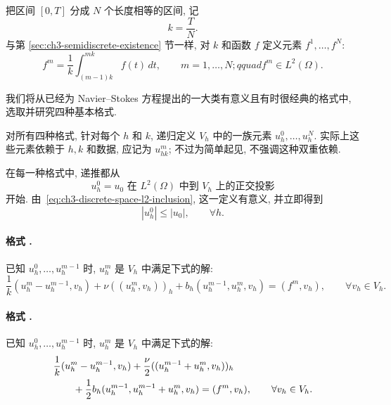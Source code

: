 把区间 $[0,T]$ 分成 $N$ 个长度相等的区间, 记
\begin{equation}
k=\frac TN.
\label{eq:ch3-discrete-time-step}
\end{equation}
与第 \ref{sec:ch3-semidiscrete-existence} 节一样, 对 $k$ 和函数 $f$ 定义元素 $f^1,\ldots,f^N$:
\begin{equation}
f^m=\frac1k\int_{(m-1)k}^{mk}f(t)\,dt,
\qquad m=1,\ldots,N;qquad f^m\in L^2(\Omega).
\label{eq:ch3-discrete-force-average}
\end{equation}

我们将从已经为 Navier--Stokes 方程提出的一大类有意义且有时很经典的格式中, 选取并研究四种基本格式.

对所有四种格式, 针对每个 $h$ 和 $k$, 递归定义 $V_h$ 中的一族元素 $u_h^0,\ldots,u_h^N$. 实际上这些元素依赖于 $h,k$ 和数据, 应记为 $u_{hk}^m$; 不过为简单起见, 不强调这种双重依赖.

在每一种格式中, 递推都从
\begin{equation}
u_h^0=\text{$u_0$ 在 $L^2(\Omega)$ 中到 $V_h$ 上的正交投影}
\label{eq:ch3-discrete-initial-projection}
\end{equation}
开始. 由 \,\eqref{eq:ch3-discrete-space-l2-inclusion}, 这一定义有意义, 并立即得到
\begin{equation}
|u_h^0|\leq|u_0|,
\qquad\forall h.
\label{eq:ch3-discrete-initial-projection-bound}
\end{equation}

\label{scheme:ch3-fully-implicit}
\paragraph{格式 \thembscheme.}
已知 $u_h^0,\ldots,u_h^{m-1}$ 时, $u_h^m$ 是 $V_h$ 中满足下式的解:
\begin{equation}
\frac1k(u_h^m-u_h^{m-1},v_h)+\nu((u_h^m,v_h))_h
+b_h(u_h^{m-1},u_h^m,v_h)=(f^m,v_h),
\qquad\forall v_h\in V_h.
\label{eq:ch3-scheme-51}
\end{equation}

\label{scheme:ch3-crank-nicholson}
\paragraph{格式 \thembscheme.}
已知 $u_h^0,\ldots,u_h^{m-1}$ 时, $u_h^m$ 是 $V_h$ 中满足下式的解:
\begin{align}
&\frac1k(u_h^m-u_h^{m-1},v_h)
+\frac\nu2((u_h^{m-1}+u_h^m,v_h))_h \notag\\
&\qquad+\frac12b_h(u_h^{m-1},u_h^{m-1}+u_h^m,v_h)
=(f^m,v_h),\qquad\forall v_h\in V_h.
\label{eq:ch3-scheme-52}
\end{align}

